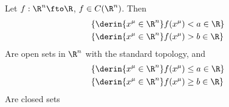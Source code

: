 \documentclass[../mmf.tex]{subfiles}
\begin{document}
\begin{thm}
	Let $f:\R^n\fto\R$, $f\in C(\R^n)$. Then
	\begin{equation}
		\begin{aligned}
			&\{\derin{x^\mu\in\R^n}f(x^\mu)<a\in\R\}\\
			&\{\derin{x^\mu\in\R^n}f(x^\mu)>b\in\R\}
		\end{aligned}
		\label{eq:opensetsfc}
	\end{equation}
	Are open sets in $\R^n$ with the standard topology, and
	\begin{equation}
		\begin{aligned}
			&\{\derin{x^\mu\in\R^n}f(x^\mu)\le a\in\R\}\\
			&\{\derin{x^\mu\in\R^n}f(x^\mu)\ge b\in\R\}
		\end{aligned}
		\label{eq:closedsetsfc}
	\end{equation}
	Are closed sets
\end{thm}
\end{document}
